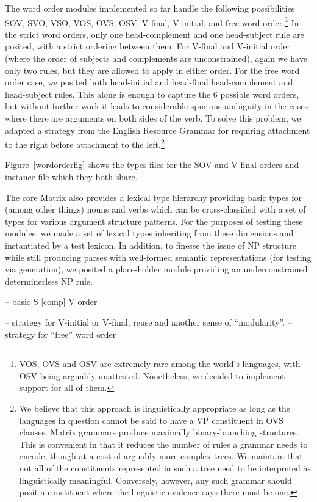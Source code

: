 \documentclass[11pt]{article}
\begin{document}
The word order modules implemented so far handle the following
possibilities SOV, SVO, VSO, VOS, OVS, OSV, V-final, V-initial, and
free word order.\footnote{VOS, OVS and OSV are extremely rare among
the world's languages, with OSV being arguably unattested.
Nonetheless, we decided to implement support for all of them.}  In the
strict word orders, only one head-complement and one head-subject rule
are posited, with a strict ordering between them.  For V-final and
V-initial order (where the order of subjects and complements are
unconstrained), again we have only two rules, but they are allowed to
apply in either order.  For the free word order case, we posited both
head-initial and head-final head-complement and head-subject rules.
This alone is enough to capture the 6 possible word orders, but
without further work it leads to considerable spurious ambiguity in
the cases where there are arguments on both sides of the verb.  To
solve this problem, we adapted a strategy from the English Resource
Grammar for requiring attachment to the right before attachment to the
left.\footnote{We believe that this approach is linguistically
appropriate as long as the languages in question cannot be said to
have a VP constituent in OVS clauses.  Matrix grammars produce
maximally binary-branching structures.  This is convenient in that it
reduces the number of rules a grammar needs to encode, though at a
cost of arguably more complex trees.  We maintain that not all of the
constituents represented in such a tree need to be interpreted as
linguistically meaningful.  Conversely, however, any such grammar
should posit a constituent where the linguistic evidence says there
must be one.}

Figure~\ref{wordorderfig} shows the types files for the SOV and
V-final orders and instance file which they both share.

The core Matrix also provides a lexical type hierarchy
providing basic types for (among other things) nouns and verbs which
can be cross-classified with a set of types for various argument
structure patterns.  For the purposes of testing these modules,
we made a set of lexical types inheriting from these dimensions and
instantiated by a test lexicon.  In addition, to finesse the issue
of NP structure while still producing parses with well-formed semantic
representations (for testing via generation), we posited a place-holder
module providing an underconstrained determinerless NP rule.

-- basic S [comp] V order

-- strategy for V-initial or V-final; reuse and another sense of ``modularity''.
-- strategy for ``free'' word order
\end{document}
